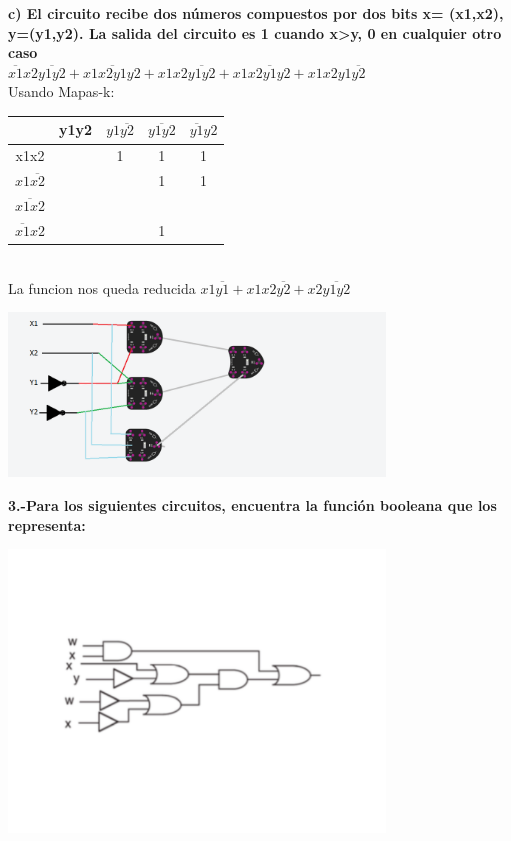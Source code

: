 \documentclass[paper=letter, fontsize=12pt]{scrartcl}
\begin{document}
{\bf c) El circuito recibe dos números compuestos por dos bits x= (x1,x2), y=(y1,y2). La salida del circuito es 1 cuando x>y, 0 en cualquier otro caso}\\
$\overline{x1}x2\overline{y1y2}+x1\overline{x2y1}y2+x1x2\overline{y1y2}+x1x2\overline{y1}y2+x1x2y1\overline{y2}$\\
Usando Mapas-k:
\begin{tabular}{|c|c|c|c|c|}\hline 
   & y1y2 & $y1\overline{y2}$ & $\overline{y1y2}$ & $\overline{y1}y2$ \\ \hline
 x1x2  &  & 1 & 1 & 1 \\ \hline
 $x1\overline{x2}$ & &  & 1 & 1\\ \hline
 $\overline{x1x2}$ & & & & \\ \hline
 $\overline{x1}x2$ & & & 1 & \\ \hline 
\end{tabular}\\
La funcion nos queda reducida $x1\overline{y1}+x1x2\overline{y2}+x2\overline{y1y2}$\\
\begin{center}                  
      \includegraphics[width=10cm]{img/circuito3.png}
    \end{center}
 {\Large{\bf 3.-Para los siguientes circuitos, encuentra la función booleana que los representa:}}\\
 \begin{center}                  
      \includegraphics[width=10cm]{img/circuit1.png}
    \end{center}
\end{document}
